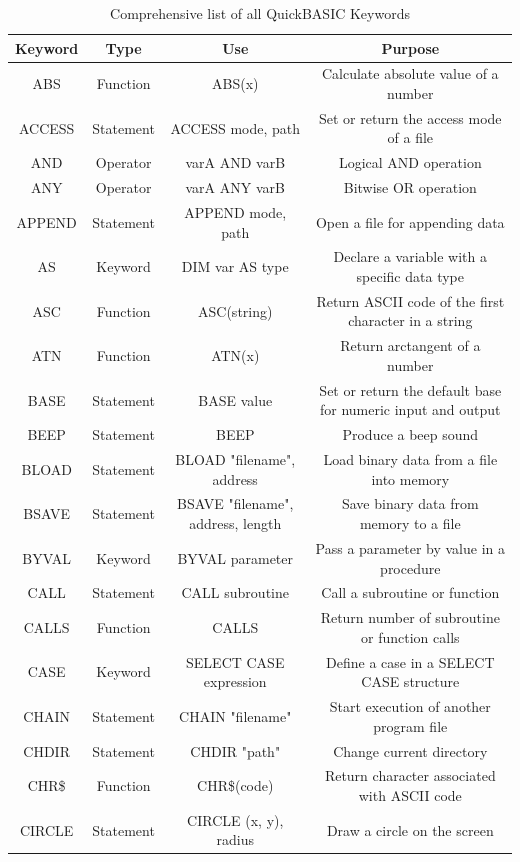 \documentclass[10pt, reqno]{exam}
\begin{document}
{
\footnotesize
\begin{longtable}{|c|c|c|c|}
    \caption{Comprehensive list of all QuickBASIC Keywords}
    \label{tbl:keywords} \\
    \hline
    Keyword & Type & Use & Purpose \\
    \hline
    ABS & Function & ABS(x) & Calculate absolute value of a number \\
    ACCESS & Statement & ACCESS mode, path & Set or return the access mode of a file \\
    AND & Operator & varA AND varB & Logical AND operation \\
    ANY & Operator & varA ANY varB & Bitwise OR operation \\
    APPEND & Statement & APPEND mode, path & Open a file for appending data \\
    AS & Keyword & DIM var AS type & Declare a variable with a specific data type \\
    ASC & Function & ASC(string) & Return ASCII code of the first character in a string \\
    ATN & Function & ATN(x) & Return arctangent of a number \\
    BASE & Statement & BASE value & Set or return the default base for numeric input and output \\
    BEEP & Statement & BEEP & Produce a beep sound \\
    BLOAD & Statement & BLOAD "filename", address & Load binary data from a file into memory \\
    BSAVE & Statement & BSAVE "filename", address, length & Save binary data from memory to a file \\
    BYVAL & Keyword & BYVAL parameter & Pass a parameter by value in a procedure \\
    CALL & Statement & CALL subroutine & Call a subroutine or function \\
    CALLS & Function & CALLS & Return number of subroutine or function calls \\
    CASE & Keyword & SELECT CASE expression & Define a case in a SELECT CASE structure \\
    CHAIN & Statement & CHAIN "filename" & Start execution of another program file \\
    CHDIR & Statement & CHDIR "path" & Change current directory \\
    CHR\$ & Function & CHR\$(code) & Return character associated with ASCII code \\
    CIRCLE & Statement & CIRCLE (x, y), radius & Draw a circle on the screen \\

\end{longtable}}
\end{document}
